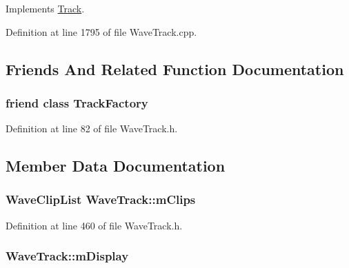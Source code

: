 Implements \hyperlink{class_track_a1352ca92740f520fc35ad17c79072110}{Track}.



Definition at line 1795 of file Wave\+Track.\+cpp.



\subsection{Friends And Related Function Documentation}
\subsubsection[{\texorpdfstring{Track\+Factory}{TrackFactory}}]{\setlength{\rightskip}{0pt plus 5cm}friend class {\bf Track\+Factory}\hspace{0.3cm}{\ttfamily [friend]}}\hypertarget{class_wave_track_a9090c4844308a62885cce4b693b74666}{}\label{class_wave_track_a9090c4844308a62885cce4b693b74666}


Definition at line 82 of file Wave\+Track.\+h.



\subsection{Member Data Documentation}
\subsubsection[{\texorpdfstring{m\+Clips}{mClips}}]{\setlength{\rightskip}{0pt plus 5cm}Wave\+Clip\+List Wave\+Track\+::m\+Clips\hspace{0.3cm}{\ttfamily [protected]}}\hypertarget{class_wave_track_aab186786a53179d53c986771c42f5880}{}\label{class_wave_track_aab186786a53179d53c986771c42f5880}


Definition at line 460 of file Wave\+Track.\+h.

\subsubsection[{\texorpdfstring{m\+Display}{mDisplay}}]{ Wave\+Track\+::m\+Display\hspace{0.3cm}{\ttfamily [protected]}}\hypertarget{class_wave_track_a8c6f228f31fb7b7c144ca775d4600c10}{}\label{class_wave_track_a8c6f228f31fb7b7c144ca775d4600c10}


